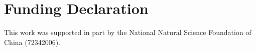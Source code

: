 \documentclass[12pt]{article}
\begin{document}
%
%



\section*{Funding Declaration}
This work was supported in part by the National Natural Science
Foundation of China (72342006).

\end{document}
